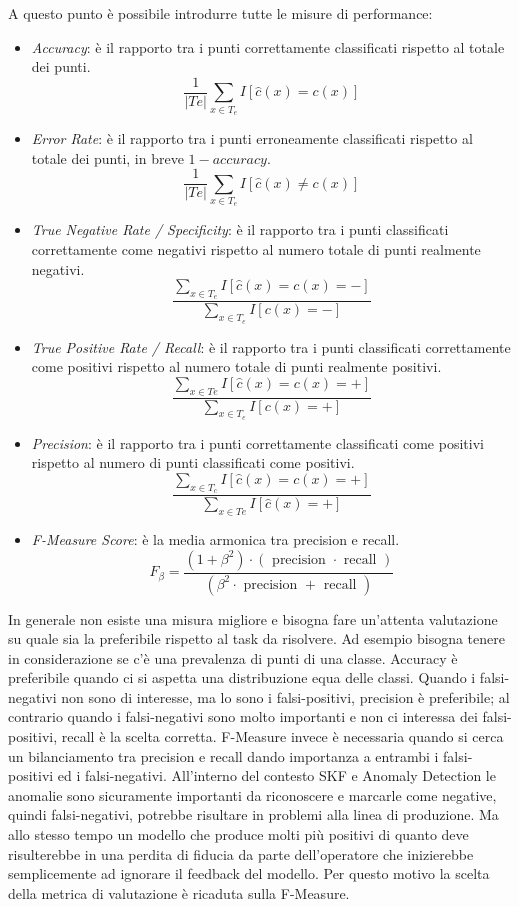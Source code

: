 A questo punto è possibile introdurre tutte le misure di performance:
\begin{itemize}
\item \textit{Accuracy}: è il rapporto tra i punti correttamente classificati rispetto al totale dei punti.
\[\frac{1}{|Te|} \sum_{x \in T_e} I[\hat{c}(x)=c(x)]\]
\item \textit{Error Rate}: è il rapporto tra i punti erroneamente classificati rispetto al totale dei punti, in breve \(1-accuracy\).
\[\frac{1}{|Te|} \sum_{x \in T_e} I[\hat{c}(x)\neq c(x)]\]
\item \textit{True Negative Rate / Specificity}: è il rapporto tra i punti classificati correttamente come negativi rispetto al numero totale di punti realmente negativi.
\[\frac{\sum_{x \in T_e} I[\hat{c}(x)=c(x)=-]}{\sum_{x \in T_e} I[c(x)=-]}\]
\item \textit{True Positive Rate / Recall}: è il rapporto tra i punti classificati correttamente come positivi rispetto al numero totale di punti realmente positivi.
\[\frac{\sum_{x \in T e} I[\hat{c}(x)=c(x)=+]}{\sum_{x \in T_e} I[c(x)=+]}\]
\item \textit{Precision}: è il rapporto tra i punti correttamente classificati come positivi rispetto al numero di punti classificati come positivi.
\[\frac{\sum_{x \in T_c} I[\hat{c}(x)=c(x)=+]}{\sum_{x \in T e} I[\hat{c}(x)=+]}\]
\item \textit{F-Measure Score}: è la media armonica tra precision e recall.
\[F_\beta=\frac{\left(1+\beta^2\right) \cdot(\text { precision } \cdot \text { recall })}{\left(\beta^2 \cdot \text { precision }+\text { recall }\right)}\]
\end{itemize}

In generale non esiste una misura migliore e bisogna fare un'attenta valutazione su quale sia la preferibile rispetto al task da risolvere.
Ad esempio bisogna tenere in considerazione se c'è una prevalenza di punti di una classe. Accuracy è preferibile quando ci si aspetta una distribuzione equa delle classi. Quando i falsi-negativi non sono di interesse, ma lo sono i falsi-positivi, precision è preferibile; al contrario quando i falsi-negativi sono molto importanti e non ci interessa dei falsi-positivi, recall è la scelta corretta.
F-Measure invece è necessaria quando si cerca un bilanciamento tra precision e recall dando importanza a entrambi i falsi-positivi ed i falsi-negativi. 
All'interno del contesto SKF e Anomaly Detection le anomalie sono sicuramente importanti da riconoscere e marcarle come negative, quindi falsi-negativi, potrebbe risultare in problemi alla linea di produzione. Ma allo stesso tempo un modello che produce molti più positivi di quanto deve risulterebbe in una perdita di fiducia da parte dell'operatore che inizierebbe semplicemente ad ignorare il feedback del modello. Per questo motivo la scelta della metrica di valutazione è ricaduta sulla F-Measure.



